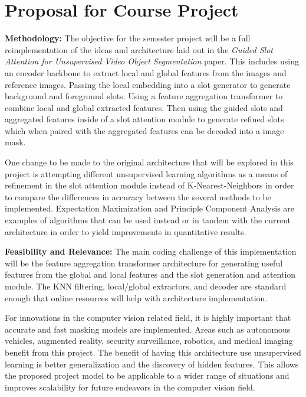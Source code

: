 \documentclass{article}
\theoremstyle{plain}
\theoremstyle{definition}
\theoremstyle{remark}
\begin{document}
\section*{Proposal for Course Project}
\textbf{Methodology: }
The objective for the semester project will be a full reimplementation of the ideas and architecture laid out in the \textit{Guided Slot Attention for Unsupervised Video Object Segmentation} paper. This includes using an encoder backbone to extract local and global features from the images and reference images. Passing the local embedding into a slot generator to generate background and foreground slots. Using a feature aggregation transformer to combine local and global extracted features. Then using the guided slots and aggregated features inside of a slot attention module to generate refined slots which when paired with the aggregated features can be decoded into a image mask. 

\hspace{20pt} One change to be made to the original architecture that will be explored in this project is attempting different unsupervised learning algorithms as a means of refinement in the slot attention module instead of K-Nearest-Neighbors in order to compare the differences in accuracy between the several methods to be implemented. Expectation Maximization and Principle Component Analysis are examples of algorithms that can be used instead or in tandem with the current architecture in order to yield improvements in quantitative results.

\textbf{Feasibility and Relevance: }
The main coding challenge of this implementation will be the feature aggregation transformer architecture for generating useful features from the global and local features and the slot generation and attention module. The KNN filtering, local/global extractors, and decoder are standard enough that online resources will help with architecture implementation. 

\hspace{20pt} For innovations in the computer vision related field, it is highly important that accurate and fast masking models are implemented. Areas such as autonomous vehicles, augmented reality, security surveillance, robotics, and medical imaging benefit from this project. The benefit of having this architecture use unsupervised learning is better generalization and the discovery of hidden features. This allows the proposed project model to be applicable to a wider range of situations and improves scalability for future endeavors in the computer vision field.
\end{document}
